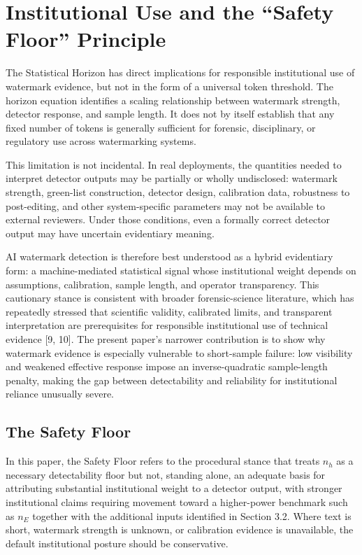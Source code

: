 \documentclass[11pt]{article}
\begin{document}
\section{Institutional Use and the ``Safety Floor'' Principle}

The Statistical Horizon has direct implications for responsible institutional use of
watermark evidence, but not in the form of a universal token threshold. The horizon
equation identifies a scaling relationship between watermark strength, detector
response, and sample length. It does not by itself establish that any fixed number
of tokens is generally sufficient for forensic, disciplinary, or regulatory use
across watermarking systems.

This limitation is not incidental. In real deployments, the quantities needed to
interpret detector outputs may be partially or wholly undisclosed: watermark
strength, green-list construction, detector design, calibration data, robustness to
post-editing, and other system-specific parameters may not be available to external
reviewers. Under those conditions, even a formally correct detector output may have
uncertain evidentiary meaning.

AI watermark detection is therefore best understood as a hybrid evidentiary form: a
machine-mediated statistical signal whose institutional weight depends on
assumptions, calibration, sample length, and operator transparency. This cautionary
stance is consistent with broader forensic-science literature, which has repeatedly
stressed that scientific validity, calibrated limits, and transparent interpretation
are prerequisites for responsible institutional use of technical evidence [9, 10].
The present paper's narrower contribution is to show why watermark evidence is
especially vulnerable to short-sample failure: low visibility and weakened effective
response impose an inverse-quadratic sample-length penalty, making the gap between
detectability and reliability for institutional reliance unusually severe.

\subsection{The Safety Floor}

In this paper, the Safety Floor refers to the procedural stance that treats $n_h$ as
a necessary detectability floor but not, standing alone, an adequate basis for
attributing substantial institutional weight to a detector output, with stronger
institutional claims requiring movement toward a higher-power benchmark such as
$n_E$ together with the additional inputs identified in Section 3.2. Where text is
short, watermark strength is unknown, or calibration evidence is unavailable, the
default institutional posture should be conservative.
\end{document}
